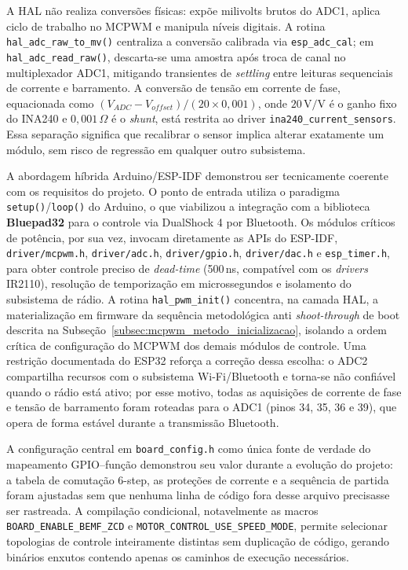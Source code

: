 A HAL não realiza conversões físicas: expõe milivolts brutos do ADC1, aplica ciclo de trabalho no MCPWM e manipula níveis digitais. A rotina \texttt{hal\_adc\_raw\_to\_mv()} centraliza a conversão calibrada via \texttt{esp\_adc\_cal}; em \texttt{hal\_adc\_read\_raw()}, descarta-se uma amostra após troca de canal no multiplexador ADC1, mitigando transientes de \textit{settling} entre leituras sequenciais de corrente e barramento. A conversão de tensão em corrente de fase, equacionada como $(V_{ADC} - V_{offset}) / (20 \times 0{,}001)$, onde $20\,\text{V/V}$ é o ganho fixo do INA240 e $0{,}001\,\Omega$ é o \textit{shunt}, está restrita ao driver \texttt{ina240\_current\_sensors}. Essa separação significa que recalibrar o sensor implica alterar exatamente um módulo, sem risco de regressão em qualquer outro subsistema.

A abordagem híbrida Arduino/ESP-IDF demonstrou ser tecnicamente coerente com os requisitos do projeto. O ponto de entrada utiliza o paradigma \texttt{setup()}/\texttt{loop()} do Arduino, o que viabilizou a integração com a biblioteca \textbf{Bluepad32} para o controle via DualShock 4 por Bluetooth. Os módulos críticos de potência, por sua vez, invocam diretamente as APIs do ESP-IDF, \texttt{driver/mcpwm.h}, \texttt{driver/adc.h}, \texttt{driver/gpio.h}, \texttt{driver/dac.h} e \texttt{esp\_timer.h}, para obter controle preciso de \textit{dead-time} (500\,ns, compatível com os \textit{drivers} IR2110), resolução de temporização em microssegundos e isolamento do subsistema de rádio. A rotina \texttt{hal\_pwm\_init()} concentra, na camada HAL, a materialização em firmware da sequência metodológica anti \textit{shoot-through} de boot descrita na Subseção~\ref{subsec:mcpwm_metodo_inicializacao}, isolando a ordem crítica de configuração do MCPWM dos demais módulos de controle. Uma restrição documentada do ESP32 reforça a correção dessa escolha: o ADC2 compartilha recursos com o subsistema Wi-Fi/Bluetooth e torna-se não confiável quando o rádio está ativo; por esse motivo, todas as aquisições de corrente de fase e tensão de barramento foram roteadas para o ADC1 (pinos 34, 35, 36 e 39), que opera de forma estável durante a transmissão Bluetooth.

A configuração central em \texttt{board\_config.h} como única fonte de verdade do mapeamento GPIO–função demonstrou seu valor durante a evolução do projeto: a tabela de comutação 6-step, as proteções de corrente e a sequência de partida foram ajustadas sem que nenhuma linha de código fora desse arquivo precisasse ser rastreada. A compilação condicional, notavelmente as macros \texttt{BOARD\_ENABLE\_BEMF\_ZCD} e \texttt{MOTOR\_CONTROL\_USE\_SPEED\_MODE}, permite selecionar topologias de controle inteiramente distintas sem duplicação de código, gerando binários enxutos contendo apenas os caminhos de execução necessários.

